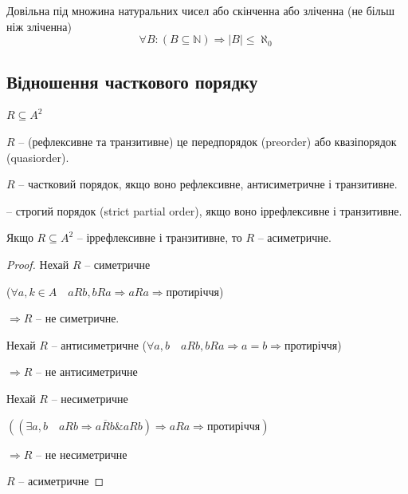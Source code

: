 \begin{theorem}
    Довільна під множина натуральних чисел або
    скінченна або зліченна (не більш ніж зліченна)
    $$\forall B: (B \subseteq \mathbb{N}) \Rightarrow |B| \leqslant \aleph_0$$
\end{theorem}

\subsection{Відношення часткового порядку}

$R \subseteq A^2$

\begin{definition}[Передпорядок]
    $R$ -- (рефлексивне та транзитивне) це передпорядок (preorder) або
    квазіпорядок (quasiorder).
\end{definition}

\begin{definition}
    $R$ -- частковий порядок, якщо воно рефлексивне,
    антисиметричне і транзитивне.
\end{definition}

\begin{definition}
    -- строгий порядок (strict partial order), якщо воно
    іррефлексивне і транзитивне.
\end{definition}

\begin{lemma}
    Якщо $R \subseteq A^2$ -- іррефлексивне і транзитивне,
    то $R$ -- асиметричне.
\end{lemma}
\begin{proof}
    Нехай $R$ -- симетричне
    
    ($\forall a, k \in A \quad aRb, bRa \Rightarrow aRa \Rightarrow \text{протиріччя}$) 

    $\Rightarrow R$ -- не симетричне.

    Нехай $R$ -- антисиметричне
    ($\forall a, b \quad aRb, bRa \Rightarrow a = b \Rightarrow \text{протиріччя}$)
    
    $\Rightarrow R$ -- не антисиметричне

    Нехай $R$ -- несиметричне

    $((\exists a, b \quad aRb \Rightarrow a\overline{R}b \& aRb) \Rightarrow aRa \Rightarrow \text{протиріччя})$
    
    $\Rightarrow R$ -- не несиметричне
    
    $R$ -- асиметричне
\end{proof}

